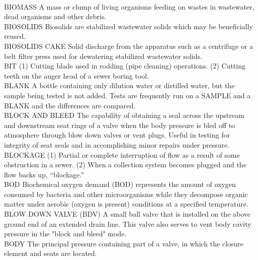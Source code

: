 \vspace{0.3cm}\\
BIOMASS
A mass or clump of living organisms feeding on wastes in wastewater, dead organisms and other debris. 
\vspace{0.3cm}\\
BIOSOLIDS
Biosolids are stabilized wastewater solids which may be beneficially reused.
\vspace{0.3cm}\\
BIOSOLIDS CAKE
Solid discharge from the apparatus such as a centrifuge or a belt filter press used for dewatering stabilized wastewater solids. 
\vspace{0.3cm}\\
BIT
(1) Cutting blade used in rodding (pipe cleaning) operations. (2) Cutting teeth on the auger head of a sewer boring tool. 
\vspace{0.3cm}\\
BLANK
A bottle containing only dilution water or distilled water, but the sample being tested is not added. Tests are frequently run on a SAMPLE and a BLANK and the differences are compared.
\vspace{0.3cm}\\
BLOCK AND BLEED
The capability of obtaining a seal across the upstream and downstream seat rings of a valve when the body pressure is bled off to atmosphere through blow down valves or vent plugs. Useful in testing for integrity of seat seals and in accomplishing minor repairs under pressure.
\vspace{0.3cm}\\
BLOCKAGE
(1) Partial or complete interruption of flow as a result of some obstruction in a sewer. (2) When a collection system becomes plugged and the flow backs up, “blockage.” 
\vspace{0.3cm}\\
BOD
Biochemical oxygen demand (BOD) represents the amount of oxygen consumed by bacteria and other microorganisms while they decompose organic matter under aerobic (oxygen is present) conditions at a specified temperature.
\vspace{0.3cm}\\
BLOW DOWN VALVE (BDV)
A small ball valve that is installed on the above ground end of an extended drain line. This valve also serves to vent body cavity pressure in the "block and bleed" mode.
\vspace{0.3cm}\\
BODY
The principal pressure containing part of a valve, in which the closure element and seats are located.
